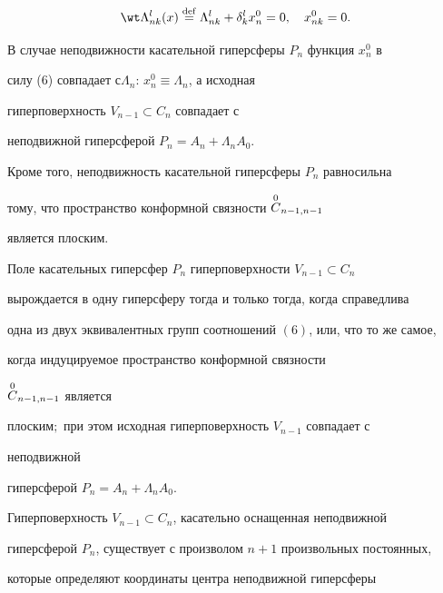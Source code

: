 \begin{equation} 


\wt \Lambda{}^l_{nk}(x)\eqdef \Lambda^l_{nk}+ 


\delta^l_k x^0_n=0,\quad x^0_{nk}=0. 


\end{equation} 


В случае неподвижности касательной гиперсферы $P_n$ функция $x^0_n$ в 


силу (6) совпадает с\linebreak $\Lambda_n$: $x^0_n\equiv\Lambda_n$, а исходная 


гиперповерхность $V_{n-1}\subset C_n$ совпадает с 


неподвижной гиперсферой $P_n=A_n+\Lambda_nA_0$. 


Кроме того, неподвижность касательной гиперсферы $P_n$ равносильна 


тому, что пространство конформной связности $\overset{0}{C}{}_{n-1,n-1}$ 


является плоским. 


 


 


\begin{thm} 


Поле касательных гиперсфер $P_n$ гиперповерхности $V_{n-1}\subset C_n$ 


вырождается в одну гиперсферу тогда и только тогда, когда справедлива 


одна из двух эквивалентных групп соотношений $(6)$, или, что то же самое, 


когда индуцируемое пространство конформной связности 


$\overset{0}{C}{}_{n-1,n-1}$ является  


плоским\/$;$ при этом исходная гиперповерхность $V_{n-1}$ совпадает с 


неподвижной 


гиперсферой $P_n=A_n+\Lambda_nA_0$. 


\end{thm} 


 


Гиперповерхность $V_{n-1}\subset C_n$, касательно оснащенная неподвижной 


гиперсферой $P_n$, существует с произволом $n+1$ произвольных постоянных, 


которые определяют координаты центра неподвижной гиперсферы 


